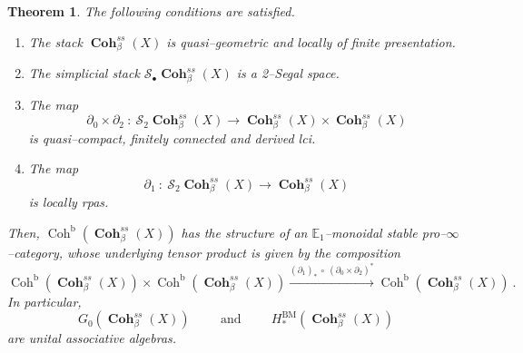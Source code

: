 \documentclass[11pt]{article}
\newtheorem{theorem}{Theorem}
\newcommand{\segal}{\mathcal{S}}
\newcommand{\coh}{\operatorname{Coh}}
\newcommand{\cohbetassstack}{\boldsymbol{\operatorname{Coh}}^{ss}_{\beta}(X)}
\newcommand{\waldhausen}{\mathcal{S}_{\bullet}}
\begin{document}
    \begin{theorem}\label{thm : cathabeta}
    The following conditions are satisfied.
    \begin{enumerate}
        \item The stack $\cohbetassstack$ is quasi--geometric and locally of finite presentation. 

        \item\label{itm : catbeta segal} The simplicial stack $\waldhausen\cohbetassstack$ is a 2--Segal space.
        
        \item\label{itm : catmeta smooth} The map 
            \begin{equation}
                \partial_0 \times \partial_2\ \colon \ \segal_2\cohbetassstack \longrightarrow \cohbetassstack \times \cohbetassstack
            \end{equation}
            is quasi--compact, finitely connected and derived lci.
        \item\label{itm : catbeta proper} The map
        \begin{equation}
            \partial_1\ \colon \ \segal_2\cohbetassstack \longrightarrow \cohbetassstack
        \end{equation}
        is locally rpas.
        \end{enumerate}
        Then, $\coh^{\operatorname{b}}(\cohbetassstack)$ has the structure of an $\mathbb{E}_1$--monoidal stable pro--$\infty$--category, whose underlying tensor product is given by the composition
        \[
            \coh^{\operatorname{b}}(\cohbetassstack)\times \coh^{\operatorname{b}}(\cohbetassstack) \xrightarrow{(\partial_{1})_*\ \circ \ (\partial_0 \times\partial_2)^*} \coh^{\operatorname{b}}(\cohbetassstack)\ .
        \]
        In particular, 
        \[ 
            G_0(\cohbetassstack) \hspace{1cm} \text{and} \hspace{1cm} H^{\text{BM}}_*(\cohbetassstack)
        \]
        are unital associative algebras.
    \end{theorem}
\end{document}
